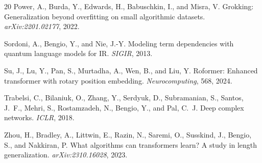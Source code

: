 \documentclass[11pt]{article}
\theoremstyle{definition}
\begin{document}
\begin{thebibliography}{20}
Power, A., Burda, Y., Edwards, H., Babuschkin, I., and Misra, V.
\newblock Grokking: Generalization beyond overfitting on small algorithmic datasets.
\newblock \emph{arXiv:2201.02177}, 2022.

Sordoni, A., Bengio, Y., and Nie, J.-Y.
\newblock Modeling term dependencies with quantum language models for IR.
\newblock \emph{SIGIR}, 2013.

Su, J., Lu, Y., Pan, S., Murtadha, A., Wen, B., and Liu, Y.
\newblock Roformer: Enhanced transformer with rotary position embedding.
\newblock \emph{Neurocomputing}, 568, 2024.

Trabelsi, C., Bilaniuk, O., Zhang, Y., Serdyuk, D., Subramanian, S., Santos, J.~F., Mehri, S., Rostamzadeh, N., Bengio, Y., and Pal, C.~J.
\newblock Deep complex networks.
\newblock \emph{ICLR}, 2018.

Zhou, H., Bradley, A., Littwin, E., Razin, N., Saremi, O., Susskind, J., Bengio, S., and Nakkiran, P.
\newblock What algorithms can transformers learn? A study in length generalization.
\newblock \emph{arXiv:2310.16028}, 2023.

\end{thebibliography}
\end{document}
